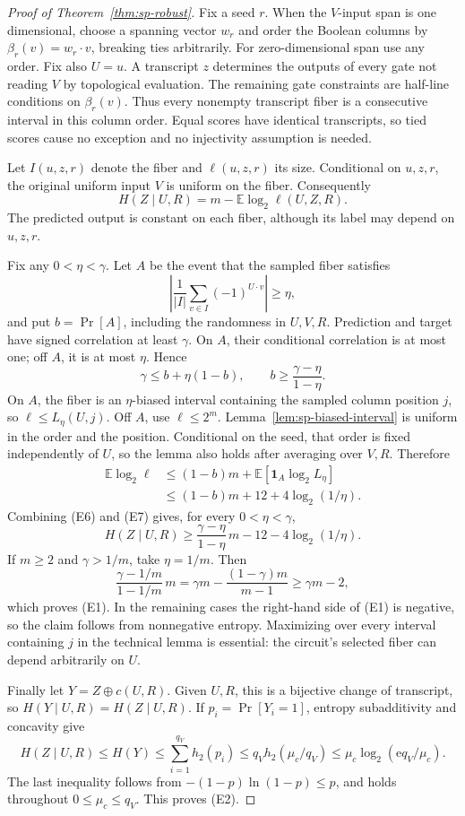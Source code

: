 \documentclass[11pt]{article}
\theoremstyle{definition}
\newcommand{\Eul}{\mathrm e}
\begin{document}
\begin{proof}[Proof of Theorem~\ref{thm:sp-robust}]
Fix a seed \(r\). When the \(V\)-input span is one dimensional, choose a
spanning vector \(w_r\) and order the Boolean columns by
\(\beta_r(v)=w_r\cdot v\), breaking ties arbitrarily. For zero-dimensional
span use any order. Fix also \(U=u\). A transcript \(z\) determines the
outputs of every gate not reading \(V\) by topological evaluation. The
remaining gate constraints are half-line conditions on \(\beta_r(v)\).
Thus every nonempty transcript fiber is a consecutive interval in this
column order. Equal scores have identical transcripts, so tied scores cause
no exception and no injectivity assumption is needed.

Let \(I(u,z,r)\) denote the fiber and \(\ell(u,z,r)\) its size. Conditional
on \(u,z,r\), the original uniform input \(V\) is uniform on the fiber.
Consequently
\[
 H(Z\mid U,R)
 =m-\mathbb E\log_2\ell(U,Z,R).                          \tag{E6}
\]
The predicted output is constant on each fiber, although its label may
depend on \(u,z,r\).

Fix any \(0<\eta<\gamma\). Let \(A\) be the event that the sampled fiber
satisfies
\[
 \left|\frac1{|I|}\sum_{v\in I}(-1)^{U\cdot v}\right|
 \ge\eta,
\]
and put \(b=\Pr[A]\), including the randomness in \(U,V,R\).
Prediction and target have signed correlation at least \(\gamma\).
On \(A\), their conditional correlation is at most one; off \(A\), it
is at most \(\eta\). Hence
\[
 \gamma\le b+\eta(1-b),
 \qquad b\ge\frac{\gamma-\eta}{1-\eta}.                  \tag{E7}
\]
On \(A\), the fiber is an \(\eta\)-biased interval containing the
sampled column position \(j\), so \(\ell\le L_\eta(U,j)\). Off \(A\),
use \(\ell\le2^m\). Lemma~\ref{lem:sp-biased-interval} is uniform in
the order and the position. Conditional on the seed, that order is fixed
independently of \(U\), so the lemma also holds after averaging over
\(V,R\). Therefore
\[
 \begin{split}
 \mathbb E\log_2\ell
 &\le(1-b)m+\mathbb E[\mathbf1_A\log_2L_\eta]\\
 &\le(1-b)m+12+4\log_2(1/\eta).
 \end{split}
\]
Combining (E6) and (E7) gives, for every \(0<\eta<\gamma\),
\[
 H(Z\mid U,R)
 \ge\frac{\gamma-\eta}{1-\eta}\,m
       -12-4\log_2(1/\eta).                             \tag{E8}
\]
If \(m\ge2\) and \(\gamma>1/m\), take \(\eta=1/m\). Then
\[
 \frac{\gamma-1/m}{1-1/m}\,m
 =\gamma m-\frac{(1-\gamma)m}{m-1}
 \ge\gamma m-2,
\]
which proves (E1). In the remaining cases the right-hand side of (E1)
is negative, so the claim follows from nonnegative entropy. Maximizing
over every interval containing \(j\) in the technical lemma is essential:
the circuit's selected fiber can depend arbitrarily on \(U\).

Finally let \(Y=Z\oplus c(U,R)\). Given \(U,R\), this is a bijective
change of transcript, so \(H(Y\mid U,R)=H(Z\mid U,R)\). If
\(p_i=\Pr[Y_i=1]\), entropy subadditivity and concavity give
\[
 H(Z\mid U,R)\le H(Y)
 \le\sum_{i=1}^{q_V}h_2(p_i)
 \le q_Vh_2(\mu_c/q_V)
 \le\mu_c\log_2(\Eul q_V/\mu_c).
\]
The last inequality follows from \(-(1-p)\ln(1-p)\le p\), and holds
throughout \(0\le\mu_c\le q_V\). This proves (E2).
\end{proof}
\end{document}
